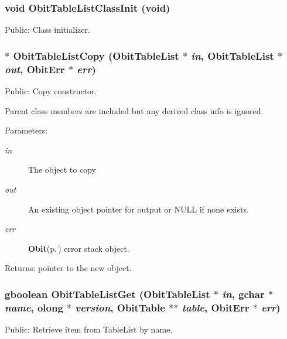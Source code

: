 \subsubsection{\setlength{\rightskip}{0pt plus 5cm}void Obit\-Table\-List\-Class\-Init (void)}\label{ObitTableList_8h_a8}


Public: Class initializer. 

\subsubsection{$\ast$ Obit\-Table\-List\-Copy ({\bf Obit\-Table\-List} $\ast$ {\em in}, {\bf Obit\-Table\-List} $\ast$ {\em out}, {\bf Obit\-Err} $\ast$ {\em err})}\label{ObitTableList_8h_a11}


Public: Copy constructor. 

Parent class members are included but any derived class info is ignored. \begin{Desc}
\item[Parameters:]
\begin{description}
\item[{\em in}]The object to copy \item[{\em out}]An existing object pointer for output or NULL if none exists. \item[{\em err}]{\bf Obit}{\rm (p.\,\pageref{structObit})} error stack object. \end{description}
\end{Desc}
\begin{Desc}
\item[Returns:]pointer to the new object. \end{Desc}
\subsubsection{\setlength{\rightskip}{0pt plus 5cm}gboolean Obit\-Table\-List\-Get ({\bf Obit\-Table\-List} $\ast$ {\em in}, gchar $\ast$ {\em name}, {\bf olong} $\ast$ {\em version}, {\bf Obit\-Table} $\ast$$\ast$ {\em table}, {\bf Obit\-Err} $\ast$ {\em err})}\label{ObitTableList_8h_a13}


Public: Retrieve item from Table\-List by name. 

